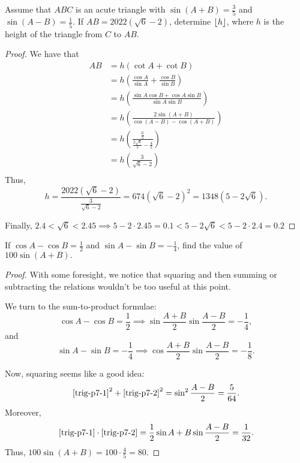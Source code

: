 \documentclass[../main.tex]{subfiles}
\begin{document}
\begin{example}[2021 SMO(O) P15]
    Assume that $ABC$ is an acute triangle with $\sin(A+B)=\frac{3}{5}$ and $\sin(A-B)=\frac{1}{5}$. If $AB=2022(\sqrt{6}-{2})$, determine $\left\lfloor h \right\rfloor$, where $h$ is the height of the triangle from $C$ to $AB$.
\end{example}
\begin{proof}
    We have that 
    \begin{align*}
        AB&=h\left(\cot{A}+\cot{B}\right) \\
        &=h\left(\frac{\cos{A}}{\sin{A}}+\frac{\cos{B}}{\sin{B}}\right) \\
        &=h\left(\frac{\sin{A}\cos{B}+\cos{A}\sin{B}}{\sin{A}\sin{B}}\right) \\
        &=h\left(\frac{2\sin(A+B)}{\cos{(A-B)}-\cos{(A+B)}}\right) \\
        &=h\left(\frac{\frac{6}{5}}{\frac{2\sqrt{6}}{5}-\frac{4}{5}}\right) \\
        &=h\left(\frac{3}{\sqrt{6}-2}\right) \\
    \end{align*}
    Thus, 
    $$h=\frac{2022(\sqrt{6}-2)}{\frac{3}{\sqrt{6}-2}}=674(\sqrt{6}-2)^2=1348(5-2\sqrt{6}).$$

    Finally, $2.4<\sqrt{6}<2.45 \implies 5-2\cdot 2.45=0.1<5-2\sqrt{6}<5-2\cdot2.4=0.2$
\end{proof}

\begin{example}[2021 SMO(S) P7]
    If $\cos{A}-\cos{B}=\frac{1}{2}$ and $\sin{A}-\sin{B}=-\frac{1}{4}$, find the value of $100\sin{(A+B)}.$
\end{example}
\begin{proof}
    With some foresight, we notice that squaring and then summing or subtracting the relations wouldn't be too useful at this point.

    We turn to the sum-to-product formulae:
    \begin{equation}\label{trig-p7-1}
        \cos{A}-\cos{B}=\frac{1}{2} \implies \sin{\frac{A+B}{2}}\sin{\frac{A-B}{2}}=-\frac{1}{4},
    \end{equation}
    and 
    \begin{equation}\label{trig-p7-2}
        \sin{A}-\sin{B}=-\frac{1}{4} \implies \cos{\frac{A+B}{2}}\sin{\frac{A-B}{2}}=-\frac{1}{8}.
    \end{equation}

    Now, squaring seems like a good idea:
    $$\eqref{trig-p7-1}^2+\eqref{trig-p7-2}^2=\sin^2{\frac{A-B}{2}=\frac{5}{64}}.$$
    Moreover, 
    $$\eqref{trig-p7-1}\cdot\eqref{trig-p7-2}=\frac{1}{2}\sin{A+B}\sin{\frac{A-B}{2}}=\frac{1}{32}.$$
    Thus, $100\sin(A+B)=100\cdot\frac{4}{5}=80.$
\end{proof}
\end{document}
